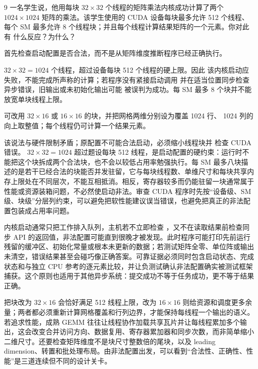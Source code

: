 \begin{solutionexercise}{9}
\problemheading 一名学生说，他用每块 $32\times32$ 个线程的矩阵乘法内核成功计算了两个
$1024\times1024$ 矩阵的乘法。该学生使用的 CUDA 设备每块最多允许 512 个线程、
每个 SM 最多允许 8 个线程块；并且每个线程计算结果矩阵的一个元素。你对此有
什么反应？为什么？

\approachheading 首先检查启动配置是否合法，而不是从矩阵维度推断程序已经正确执行。

\answerheading $32\times32=1024$ 个线程，超过设备每块 512 个线程的硬上限。因此
该内核启动应失败，不能完成所声称的计算；若程序没有紧接启动调用
 并在适当位置同步检查异步错误，旧输出或未初始化输出可能
被误判为成功。每 SM 最多 8 个块并不能放宽单块线程上限。

可改用 $32\times16$ 或 $16\times16$ 的块，并把网格两维分别设为覆盖 1024 行、
1024 列的向上取整值；每个线程仍可计算一个结果元素。

\conclusionheading 该说法与硬件限制矛盾；原配置不可能合法启动，必须缩小线程块并
检查 CUDA 错误。
\discussionheading
{}
$32\times32=1024$ 超过题设每块 512 线程，是启动配置的硬约束：运行时不能把这个块拆成两个合法块，也不会以较低占用率勉强执行。每 SM 最多八块描述的是若干已经合法的块能否并发驻留，它与每块线程数、单维尺寸和每块共享内存上限处在不同层次，不能互相抵消。相反，寄存器较多而仍能驻留一块通常属于性能或资源装箱问题，不必然使启动非法。审查 CUDA 程序时先按“设备级、SM 级、块级”分层列约束，可以避免把软性能建议误当错误，也避免把真正的非法配置包装成占用率问题。

内核启动通常只把工作排入队列，主机若不立即检查 ，又不在读取结果前检查同步 API 的返回值，非法配置可能直到很晚才被发现。此时程序可能打印先前运行残留的缓冲区、初始化常量或根本未更新的数据；若测试矩阵全零、单位阵或输出未清空，错误结果甚至会碰巧像正确答案。可靠证据必须同时包含启动状态、完成状态和与独立 CPU 参考的逐元素比较，并让负测试确认非法配置确实被测试框架捕获。这个原则也适用于其他异步系统：提交成功不等于任务成功，更不等于结果正确。

把块改为 $32\times16$ 会恰好满足 512 线程上限，改为 $16\times16$ 则给资源和调度更多余量；两者都必须重新计算网格覆盖和行列边界，才能保持每线程一个输出的语义。若追求性能，成熟 GEMM 往往让线程协作加载共享瓦片并让每线程累加多个输出，这会改变合并访问方向、数据复用、寄存器累加器和同步次数，而非简单缩小二维尺寸。还要检查矩阵维度不是块尺寸整数倍的尾块，以及 leading dimension、转置和批处理布局。由非法配置出发，可以看到“合法性、正确性、性能”是三道连续但不同的设计关卡。


\end{solutionexercise}
